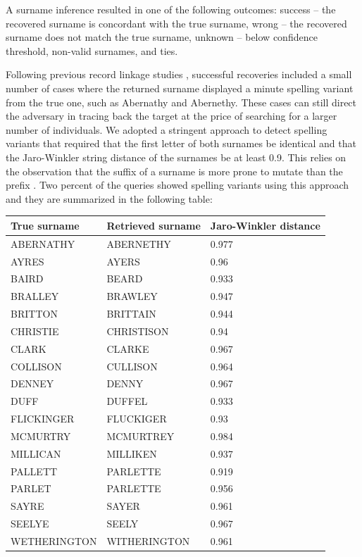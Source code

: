 A surname inference resulted in one of the following outcomes: success – the recovered surname is concordant with the true surname, wrong – the recovered surname does not match the true surname, unknown – below confidence threshold, non-valid surnames, and ties.  

Following previous record linkage studies \cite{GrannisOverhageMcDonald2004,Winkler1995}, successful recoveries included a small number of cases where the returned surname displayed a minute spelling variant from the true one, such as Abernathy and Abernethy. These cases can still direct the adversary in tracing back the target at the price of searching for a larger number of individuals. We adopted a stringent approach to detect spelling variants that required that the first letter of both surnames be identical and that the Jaro-Winkler string distance \cite{Winkler1995} of the surnames be at least 0.9. This relies on the observation that the suffix of a surname is more prone to mutate than the prefix \cite{Winkler1995}. Two percent of the queries showed spelling variants using this approach and they are summarized in the following table:

\begin{table}[h!]
\begin{tabular}{|l|l|l|}
\hline
True surname & Retrieved surname & Jaro-Winkler distance \\
\hline
ABERNATHY    & ABERNETHY    & 0.977 \\
AYRES        & AYERS        & 0.96  \\
BAIRD        & BEARD        & 0.933 \\
BRALLEY      & BRAWLEY      & 0.947 \\
BRITTON      & BRITTAIN     & 0.944 \\
CHRISTIE     & CHRISTISON   & 0.94  \\
CLARK        & CLARKE       & 0.967 \\
COLLISON     & CULLISON     & 0.964 \\
DENNEY       & DENNY        & 0.967 \\
DUFF         & DUFFEL       & 0.933 \\
FLICKINGER   & FLUCKIGER    & 0.93  \\
MCMURTRY     & MCMURTREY    & 0.984 \\
MILLICAN     & MILLIKEN     & 0.937 \\
PALLETT      & PARLETTE     & 0.919 \\
PARLET       & PARLETTE     & 0.956 \\
SAYRE        & SAYER        & 0.961 \\
SEELYE       & SEELY        & 0.967 \\
WETHERINGTON & WITHERINGTON & 0.961 \\
\hline
\end{tabular}
\end{table}

